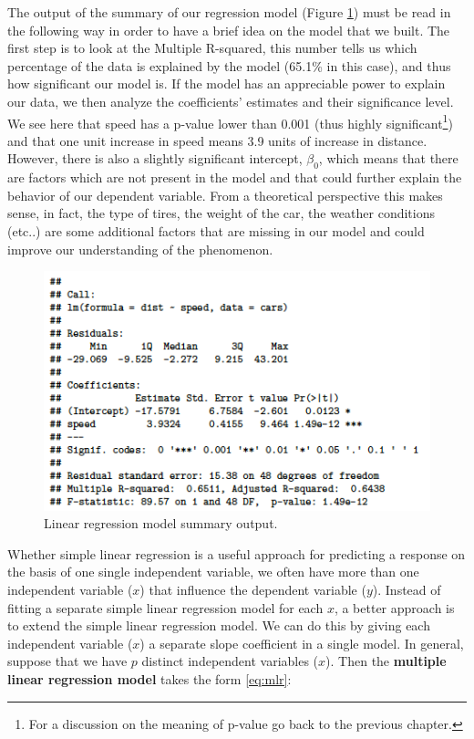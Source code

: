 \documentclass[
]{svmono}
\begin{document}
The output of the summary of our regression model (Figure \ref{fig:lm}) must be
read in the following way in order to have a brief idea on the model
that we built. The first step is to look at the Multiple R-squared, this
number tells us which percentage of the data is explained by the model
(65.1\% in this case), and thus how significant our model is. If the
model has an appreciable power to explain our data, we then analyze the
coefficients' estimates and their significance level. We see here that
speed has a p-value lower than 0.001 (thus highly significant\footnote{For a discussion on the meaning of p-value go back to the previous
  chapter.}) and
that one unit increase in speed means 3.9 units of increase in distance.
However, there is also a slightly significant intercept, \(\beta_0\),
which means that there are factors which are not present in the model
and that could further explain the behavior of our dependent variable.
From a theoretical perspective this makes sense, in fact, the type of
tires, the weight of the car, the weather conditions (etc..) are some
additional factors that are missing in our model and could improve our
understanding of the phenomenon.

\begin{figure}[H]

{\centering \includegraphics[width=0.5\linewidth,]{images/Schermata 2022-07-07 alle 17.24.44} 

}

\caption{Linear regression model summary output.}\label{fig:lm}
\end{figure}

Whether simple linear regression is a useful approach for predicting a
response on the basis of one single independent variable, we often have
more than one independent variable (\(x\)) that influence the dependent
variable (\(y\)). Instead of fitting a separate simple linear regression
model for each \(x\), a better approach is to extend the simple linear
regression model. We can do this by giving each independent variable
(\(x\)) a separate slope coefficient in a single model. In general,
suppose that we have \(p\) distinct independent variables (\(x\)). Then the
\textbf{multiple linear regression model} takes the form \eqref{eq:mlr}:
\end{document}

